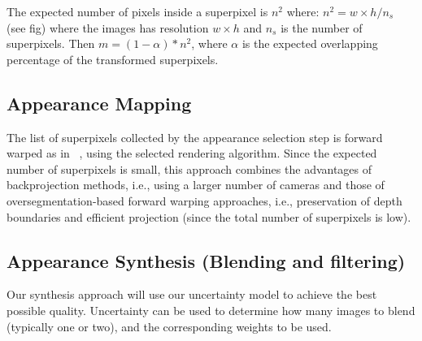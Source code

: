 The expected number of pixels inside a superpixel is $n^{2}$
where: $n^{2}=w \times h/n_s$ (see fig) where the images has resolution
$w \times h$ and $n_s$ is the number of superpixels. Then $m=(1-\alpha)*n^{2}$,
where $\alpha$ is the expected overlapping percentage of the transformed superpixels.

\subsection{Appearance Mapping}

The list of superpixels collected by the appearance selection step
is forward warped as in ~\cite{ODD15}, using the selected 
rendering algorithm. Since the expected number of superpixels is small,
this approach combines the advantages of backprojection methods,
i.e., using a larger number of cameras and those of oversegmentation-based forward warping approaches, i.e., preservation of depth boundaries and efficient projection (since the total number of superpixels is low).


\subsection{Appearance Synthesis (Blending and filtering)}

Our synthesis approach will use our uncertainty model to
achieve the best possible quality.
Uncertainty can be used to determine how many images to blend
(typically one or two), and the corresponding weights to be used.
